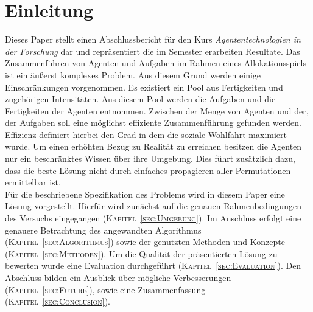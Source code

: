 \documentclass[fleqn,10pt]{SelfArx} %
\newcommand{\ChapterCite}[1]{\textsc{Kapitel~\ref{#1}}}
\begin{document}
\flushbottom %

\maketitle %

\tableofcontents %

\thispagestyle{empty} %


\section*{Einleitung} %
\label{sec:introduction}


Dieses Paper stellt einen Abschlussbericht für den Kurs \textit{Agententechnologien in der Forschung} dar und repräsentiert die im Semester erarbeiten Resultate. Das Zusammenführen von Agenten und Aufgaben im Rahmen eines Allokationsspiels ist ein äußerst komplexes Problem. Aus diesem Grund werden einige Einschränkungen vorgenommen. Es existiert ein Pool aus Fertigkeiten und zugehörigen Intensitäten. Aus diesem Pool werden die Aufgaben und die Fertigkeiten der Agenten entnommen. Zwischen der Menge von Agenten und der, der Aufgaben soll eine möglichst effiziente Zusammenführung gefunden werden. Effizienz definiert hierbei den Grad in dem die soziale Wohlfahrt maximiert wurde. Um einen erhöhten Bezug zu Realität zu erreichen besitzen die Agenten nur ein beschränktes Wissen über ihre Umgebung. Dies führt zusätzlich dazu, dass die beste Lösung nicht durch einfaches propagieren aller Permutationen ermittelbar ist. \\
Für die beschriebene Spezifikation des Problems wird in diesem Paper eine Lösung vorgestellt. Hierfür wird zunächst auf die genauen Rahmenbedingungen des Versuchs eingegangen (\ChapterCite{sec:Umgebung}). Im Anschluss erfolgt eine genauere Betrachtung des angewandten Algorithmus (\ChapterCite{sec:Algorithmus}) sowie der genutzten Methoden und Konzepte (\ChapterCite{sec:Methoden}). Um die Qualität der präsentierten Lösung zu bewerten wurde eine Evaluation durchgeführt (\ChapterCite{sec:Evaluation}). Den Abschluss bilden ein Ausblick über mögliche Verbesserungen (\ChapterCite{sec:Future}), sowie eine Zusammenfassung (\ChapterCite{sec:Conclusion}). 
\end{document}
